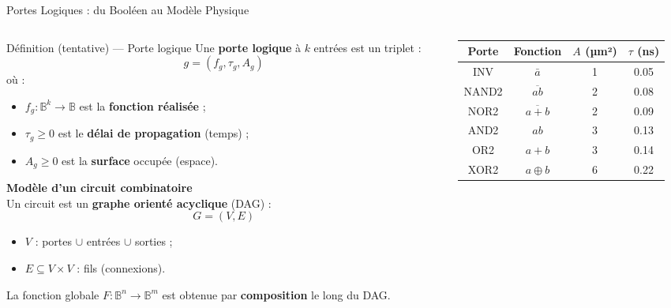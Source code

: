 \begin{frame}{Portes Logiques : du Booléen au Modèle Physique}


    \begin{columns}[T]
        \begin{column}{0.52\textwidth}
          \begin{block}{Définition  (tentative) — Porte logique }
            Une \textbf{porte logique} à \(k\) entrées est un triplet :
            \[
            g = (f_g, \tau_g, A_g)
            \]
            où :
            \begin{itemize}
              \item \(f_g : \mathbb{B}^k \to \mathbb{B}\) est la \textbf{fonction réalisée} ;
              \item \(\tau_g \geq 0\) est le \textbf{délai de propagation} (temps) ;
              \item \(A_g \geq 0\) est la \textbf{surface} occupée (espace).
            \end{itemize}
          \end{block}
            \textbf{Modèle d'un circuit combinatoire}\\[0.2cm]
            Un circuit est un \textbf{graphe orienté acyclique} (DAG) :
            \[
                G = (V, E)
            \]
            \begin{itemize}
                \item \(V\) : portes \(\cup\) entrées \(\cup\) sorties ;
                \item \(E \subseteq V \times V\) : fils (connexions).
            \end{itemize}

            \vspace{0.2cm}
            La fonction globale \(F : \mathbb{B}^n \to \mathbb{B}^m\) est obtenue par \textbf{composition} le long du DAG.
        \end{column}
        \begin{column}{0.45\textwidth}
            \centering
            \renewcommand{\arraystretch}{1.2}
            \begin{tabular}{|c|c|c|c|}
                \hline
                \textbf{Porte} & \textbf{Fonction} & \(A\) (µm²) & \(\tau\) (ns) \\
                \hline
                INV   & \(\bar{a}\)            & 1 & 0.05 \\
                NAND2 & \(\overline{ab}\)      & 2 & 0.08 \\
                NOR2  & \(\overline{a+b}\)     & 2 & 0.09 \\
                AND2  & \(ab\)                 & 3 & 0.13 \\
                OR2   & \(a+b\)                & 3 & 0.14 \\
                XOR2  & \(a \oplus b\)         & 6 & 0.22 \\
                \hline
            \end{tabular}
            \vspace{0.2cm}


\end{column}
\end{columns}
\end{frame}
